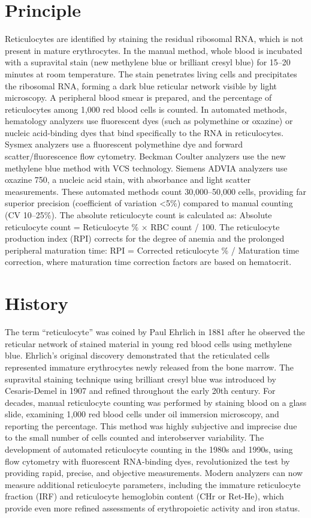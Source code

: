 \section*{Principle}
Reticulocytes are identified by staining the residual ribosomal RNA, which is not present in mature erythrocytes. In the manual method, whole blood is incubated with a supravital stain (new methylene blue or brilliant cresyl blue) for 15--20 minutes at room temperature. The stain penetrates living cells and precipitates the ribosomal RNA, forming a dark blue reticular network visible by light microscopy. A peripheral blood smear is prepared, and the percentage of reticulocytes among 1,000 red blood cells is counted. In automated methods, hematology analyzers use fluorescent dyes (such as polymethine or oxazine) or nucleic acid-binding dyes that bind specifically to the RNA in reticulocytes. Sysmex analyzers use a fluorescent polymethine dye and forward scatter/fluorescence flow cytometry. Beckman Coulter analyzers use the new methylene blue method with VCS technology. Siemens ADVIA analyzers use oxazine 750, a nucleic acid stain, with absorbance and light scatter measurements. These automated methods count 30,000--50,000 cells, providing far superior precision (coefficient of variation <5\%) compared to manual counting (CV 10--25\%). The absolute reticulocyte count is calculated as: Absolute reticulocyte count = Reticulocyte \%  $\times$  RBC count / 100. The reticulocyte production index (RPI) corrects for the degree of anemia and the prolonged peripheral maturation time: RPI = Corrected reticulocyte \% / Maturation time correction, where maturation time correction factors are based on hematocrit.

\section*{History}
The term ``reticulocyte'' was coined by Paul Ehrlich in 1881 after he observed the reticular network of stained material in young red blood cells using methylene blue. Ehrlich's original discovery demonstrated that the reticulated cells represented immature erythrocytes newly released from the bone marrow. The supravital staining technique using brilliant cresyl blue was introduced by Cesaris-Demel in 1907 and refined throughout the early 20th century. For decades, manual reticulocyte counting was performed by staining blood on a glass slide, examining 1,000 red blood cells under oil immersion microscopy, and reporting the percentage. This method was highly subjective and imprecise due to the small number of cells counted and interobserver variability. The development of automated reticulocyte counting in the 1980s and 1990s, using flow cytometry with fluorescent RNA-binding dyes, revolutionized the test by providing rapid, precise, and objective measurements. Modern analyzers can now measure additional reticulocyte parameters, including the immature reticulocyte fraction (IRF) and reticulocyte hemoglobin content (CHr or Ret-He), which provide even more refined assessments of erythropoietic activity and iron status.

